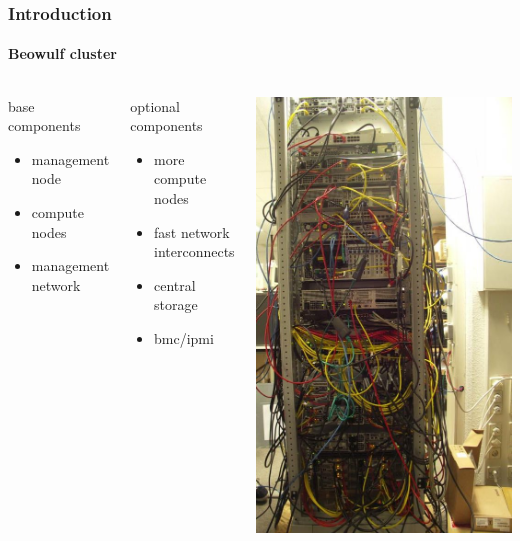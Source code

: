 \documentclass[aspectratio=169]{beamer}
\begin{document}
\begin{frame}[fragile]
\frametitle{Introduction}
\framesubtitle{Beowulf cluster}
\begin{columns}
\begin{block}{base components}
\begin{itemize}
  \item management node
  \item compute nodes
  \item management network
\end{itemize}
\end{block}
\begin{block}{optional components}
\begin{itemize}
  \item more compute nodes
  \item fast network interconnects 
  \item central storage
  \item bmc/ipmi
\end{itemize}
\end{block}
  \includegraphics[width=.6\linewidth]{Transtec-056}
\end{columns}
\end{frame}
\end{document}
